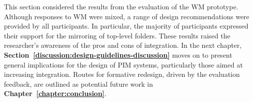 
This section considered the results from the evaluation of the WM prototype.    Although responses to WM were mixed, a range of design recommendations were provided by all participants.  In particular, the majority of participants expressed their support for the mirroring of top-level folders.  These results raised the researcher's awareness of the pros and cons of integration.  In the next chapter, \textbf{Section~\ref{discussion:design-guidelines-discussion}} moves on to present general implications for the design of PIM systems, particularly those aimed at increasing integration. %
Routes for formative redesign, driven by the evaluation feedback, are outlined as potential future work in \textbf{Chapter~\ref{chapter:conclusion}}.   
